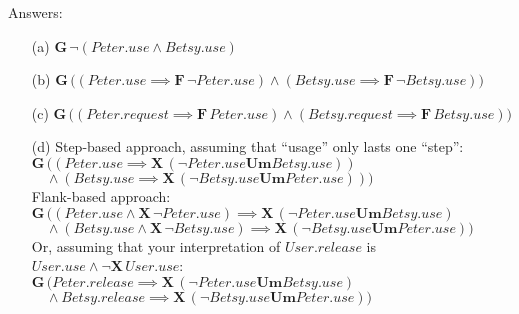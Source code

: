 \documentclass[a4paper,parskip,headheight=38pt]{scrartcl} %
\newcommand{\ltlbinop}[1]{\mathbin{\ensuremath{\mathbf{{#1}}}}}
\newcommand{\ltlunop}[1]{\mathopen{\ensuremath{\mathbf{{#1}}}}\,}
\newcommand{\ltlG}{\ltlunop{G}}
\newcommand{\ltlF}{\ltlunop{F}}
\newcommand{\ltlX}{\ltlunop{X}}
\newcommand{\ltlUm}{\ltlbinop{Um}}
\begin{document}
Answers:
\begin{itemize}
    \item[(a)] $\ltlG{} \neg(Peter.use \land Betsy.use)$
    \item[(b)] $\ltlG{} \Big( (Peter.use \implies \ltlF{} \neg{}Peter.use) \land (Betsy.use \implies \ltlF{} \neg{} Betsy.use) \Big)$
    \item[(c)] $\ltlG{} \Big( (Peter.request \implies \ltlF{} Peter.use) \land (Betsy.request \implies \ltlF{} Betsy.use) \Big)$
    \item[(d)] Step-based approach, assuming that \enquote{usage} only lasts one \enquote{step}: \\
               $\ltlG{}\Big( (Peter.use \implies \ltlX{}(\neg{}Peter.use \ltlUm{} Betsy.use))$ \\
                    \phantom{x} $\quad \land (Betsy.use \implies \ltlX{}(\neg{}Betsy.use \ltlUm{} Peter.use)) \Big)$ \\
               Flank-based approach: \\
               $\ltlG{}\Big( (Peter.use \land \ltlX{} \neg{}Peter.use) \implies \ltlX{} (\neg{}Peter.use \ltlUm{} Betsy.use)$ \\
                   \phantom{x} $\quad \land (Betsy.use \land \ltlX{} \neg{}Betsy.use) \implies \ltlX{} (\neg{}Betsy.use \ltlUm{} Peter.use) \Big)$ \\
               Or, assuming that your interpretation of $User.release$ is $User.use \land \neg{}\ltlX{}User.use$: \\
               $\ltlG{}\Big( Peter.release \implies \ltlX{} (\neg{}Peter.use \ltlUm{} Betsy.use)$ \\
                   \phantom{x} $\quad \land Betsy.release \implies \ltlX{} (\neg{}Betsy.use \ltlUm{} Peter.use) \Big)$ \\
\end{itemize}
\end{document}

